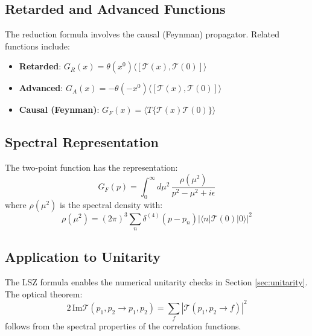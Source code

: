 \subsection{Retarded and Advanced Functions}

The reduction formula involves the causal (Feynman) propagator. Related functions include:

\begin{itemize}
    \item \textbf{Retarded}: $G_R(x) = \theta(x^0) \langle [\mathcal{T}(x), \mathcal{T}(0)] \rangle$
    \item \textbf{Advanced}: $G_A(x) = -\theta(-x^0) \langle [\mathcal{T}(x), \mathcal{T}(0)] \rangle$
    \item \textbf{Causal (Feynman)}: $G_F(x) = \langle T\{\mathcal{T}(x)\mathcal{T}(0)\} \rangle$
\end{itemize}

\subsection{Spectral Representation}

\begin{theorem}
The two-point function has the representation:
\begin{equation}
    G_F(p) = \int_0^\infty d\mu^2 \, \frac{\rho(\mu^2)}{p^2 - \mu^2 + i\epsilon}
\end{equation}
where $\rho(\mu^2)$ is the spectral density with:
\begin{equation}
    \rho(\mu^2) = (2\pi)^3 \sum_n \delta^{(4)}(p - p_n) |\langle n | \mathcal{T}(0) | 0 \rangle|^2
\end{equation}
\end{theorem}

\subsection{Application to Unitarity}

The LSZ formula enables the numerical unitarity checks in Section \ref{sec:unitarity}. The optical theorem:
\begin{equation}
    2 \, \text{Im} \mathcal{T}(p_1, p_2 \to p_1, p_2) = \sum_f |\mathcal{T}(p_1, p_2 \to f)|^2
\end{equation}
follows from the spectral properties of the correlation functions.
